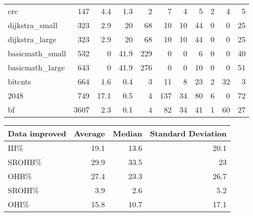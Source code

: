 \begin{tabular}{lrrrrrrrrrr}
\hline
 crc             &            147 &      4.4 &    1.3 &    2 &      7 &          4 &            5 &     2 &     4 &     5 \\
 dijkstra\_small  &            323 &      2.9 &   20   &   68 &     10 &         10 &           44 &     0 &     0 &    25 \\
 dijkstra\_large  &            323 &      2.9 &   20   &   68 &     10 &         10 &           44 &     0 &     0 &    25 \\
 basicmath\_small &            532 &      0   &   41.9 &  229 &      0 &          0 &            6 &     0 &     0 &    40 \\
 basicmath\_large &            643 &      0   &   41.9 &  276 &      0 &          0 &           10 &     0 &     0 &    51 \\
 bitcnts         &            664 &      1.6 &    0.4 &    3 &     11 &          8 &           23 &     2 &    32 &     3 \\
 2048            &            749 &     17.1 &    0.5 &    4 &    137 &         34 &           80 &     6 &     0 &    72 \\
 bf              &           3607 &      2.3 &    0.1 &    4 &     82 &         34 &           41 &     1 &    60 &    27 \\
\hline
\end{tabular}\begin{tabular}{lrrr}
\hline
 Data improved   &   Average &   Median &   Standard Deviation \\
\hline
 III\%            &      19.1 &     13.6 &                 20.1 \\
 SROHB\%          &      29.9 &     33.5 &                 23   \\
 OHB\%            &      27.4 &     23.3 &                 26.7 \\
 SROHI\%          &       3.9 &      2.6 &                  5.2 \\
 OHI\%            &      15.8 &     10.7 &                 17.1 \\
\hline
\end{tabular}
